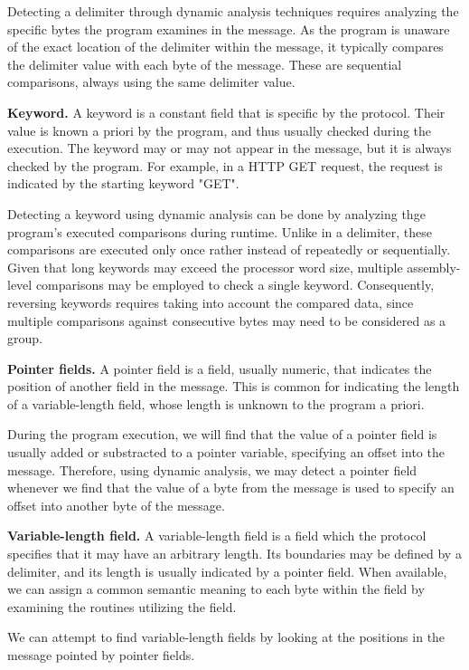 \documentclass[conference]{IEEEtran}
\begin{document}
Detecting a delimiter through dynamic analysis techniques requires analyzing
the specific bytes the program examines in the message. As the program is
unaware of the exact location of the delimiter within the message, it typically
compares the delimiter value with each byte of the message. These are
sequential comparisons, always using the same delimiter value.

\textbf{Keyword.} A keyword is a constant field that is specific by the protocol.
Their value is known a priori by the program, and thus usually checked during the execution.
The keyword may or may not appear in the message, but it is always checked by the program.
For example, in a HTTP GET request, the request is indicated by the starting keyword "GET".

Detecting a keyword using dynamic analysis can be done by analyzing thge
program's executed comparisons during runtime. Unlike in a delimiter, these
comparisons are executed only once rather instead of repeatedly or
sequentially. Given that long keywords may exceed the processor word size,
multiple assembly-level comparisons may be employed to check a single keyword.
Consequently, reversing keywords requires taking into account the compared
data, since multiple comparisons against consecutive bytes may need to be
considered as a group.

\textbf{Pointer fields.} A pointer field is a field, usually numeric, that indicates the
position of another field in the message. This is common for indicating the length of a variable-length
field, whose length is unknown to the program a priori.

During the program execution, we will find that the value of a pointer field
is usually added or substracted to a pointer variable, specifying an offset
into the message. Therefore, using dynamic analysis, we may detect a pointer
field whenever we find that the value of a byte from the message is used to
specify an offset into another byte of the message.

\textbf{Variable-length field.} A variable-length field is a field which the protocol specifies
that it may have an arbitrary length. Its boundaries may be defined by a delimiter, and its length
is usually indicated by a pointer field.
When available, we can assign a common semantic meaning to each byte within the field by
examining the routines utilizing the field.

We can attempt to find variable-length fields by looking at the positions in
the message pointed by pointer fields.
\end{document}
